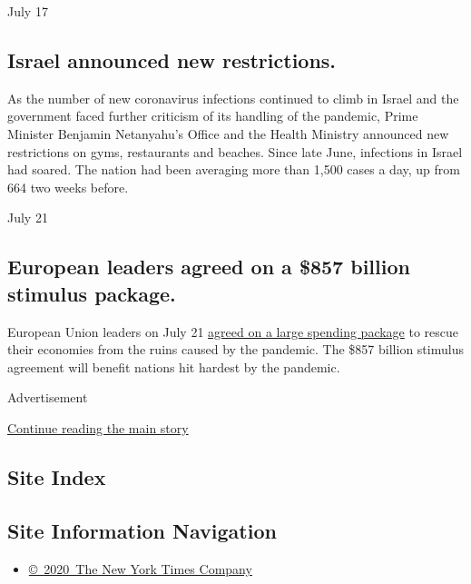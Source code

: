 July 17

\hypertarget{israel-announced-new-restrictions}{%
\subsection{Israel announced new
restrictions.}\label{israel-announced-new-restrictions}}

As the number of new coronavirus infections continued to climb in Israel
and the government faced further criticism of its handling of the
pandemic, Prime Minister Benjamin Netanyahu's Office and the Health
Ministry announced new restrictions on gyms, restaurants and beaches.
Since late June, infections in Israel had soared. The nation had been
averaging more than 1,500 cases a day, up from 664 two weeks before.

July 21

\hypertarget{european-leaders-agreed-on-a-857-billion-stimulus-package}{%
\subsection{European leaders agreed on a \$857 billion stimulus
package.}\label{european-leaders-agreed-on-a-857-billion-stimulus-package}}

European Union leaders on July 21
\href{https://www.nytimes3xbfgragh.onion/2020/07/20/world/europe/eu-stimulus-coronavirus.html?action=click\&module=RelatedLinks\&pgtype=Article}{agreed
on a large spending package} to rescue their economies from the ruins
caused by the pandemic. The \$857 billion stimulus agreement will
benefit nations hit hardest by the pandemic.

Advertisement

\protect\hyperlink{after-bottom}{Continue reading the main story}

\hypertarget{site-index}{%
\subsection{Site Index}\label{site-index}}

\hypertarget{site-information-navigation}{%
\subsection{Site Information
Navigation}\label{site-information-navigation}}

\begin{itemize}
\tightlist
\item
  \href{https://help.nytimes3xbfgragh.onion/hc/en-us/articles/115014792127-Copyright-notice}{©~2020~The
  New York Times Company}
\end{itemize}

